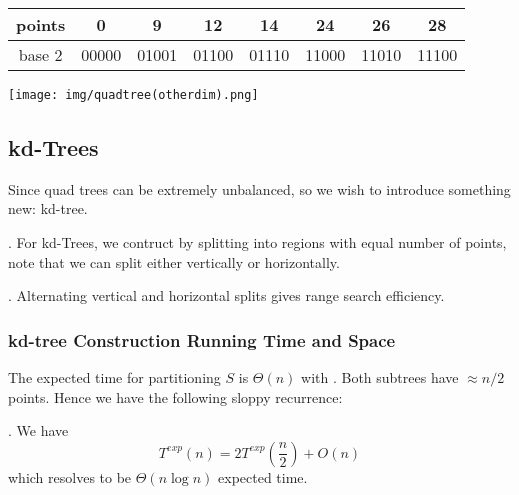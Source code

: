 \documentclass{article}
\begin{document}
\begin{center}
    \begin{tabular}{|c|c|c|c|c|c|c|c|}
        \hline
        \rowcolor[HTML]{FFFFFF} 
        \cellcolor[HTML]{FFFFFF}points & \cellcolor[HTML]{A8CC70}0 & \cellcolor[HTML]{A8CC70}9 & \cellcolor[HTML]{A8CC70}12 & \cellcolor[HTML]{A8CC70}14 & \cellcolor[HTML]{ADD8E6}24 & \cellcolor[HTML]{ADD8E6}26 & \cellcolor[HTML]{ADD8E6}28 \\ \hline
        \rowcolor[HTML]{FFFFFF} 
        \cellcolor[HTML]{FFFFFF}base 2 & \cellcolor[HTML]{A8CC70}00000 & \cellcolor[HTML]{A8CC70}01001 & \cellcolor[HTML]{A8CC70}01100 & \cellcolor[HTML]{A8CC70}01110 & \cellcolor[HTML]{ADD8E6}11000 & \cellcolor[HTML]{ADD8E6}11010 & \cellcolor[HTML]{ADD8E6}11100 \\ \hline
    \end{tabular}
    \texttt{[image: img/quadtree(otherdim).png]}
\end{center}

\subsection{kd-Trees} 

Since quad trees can be extremely unbalanced, so we wish to introduce something new: kd-tree. 

\begin{deff}.
    For kd-Trees, we contruct by splitting into regions with equal number of points, note that we can split either vertically or horizontally. 
    \begin{comm}[].
        Alternating vertical and horizontal splits gives range search efficiency. 
    \end{comm}
\end{deff}

\subsubsection{kd-tree Construction Running Time and Space} 

The expected time for partitioning $S$ is $\Theta(n)$ with . Both subtrees have $\approx n/2$ points. Hence we have the following sloppy recurrence: 

\begin{thmm}[].
    We have 
    \[ T^{exp}(n) = 2 T^{exp} \left( \frac{n}{2} \right) + O(n) \]
    which resolves to be $\Theta(n \log n)$ expected time. 
\end{thmm}
\end{document}
